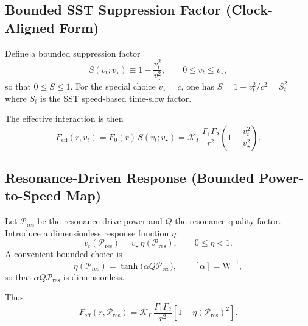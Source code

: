 \documentclass[11pt, a4paper]{article}
\begin{document}
        \subsection{Bounded SST Suppression Factor (Clock-Aligned Form)}
            Define a bounded suppression factor
            \begin{equation}
                S(v_t;v_\star) \equiv 1-\frac{v_t^2}{v_\star^2},
                \qquad 0\le v_t \le v_\star,
                \label{eq:Svt}
            \end{equation}
            so that $0\le S\le 1$.
            For the special choice $v_\star=c$, one has $S = 1-v_t^2/c^2 = S_t^2$ where $S_t$ is the SST speed-based time-slow factor.
            
            The effective interaction is then
            \begin{equation}
                F_{\mathrm{eff}}(r,v_t) = F_0(r)\,S(v_t;v_\star)
                = \mathcal{K}_{\Gamma}\,\frac{\Gamma_1\Gamma_2}{r^2}
                \left(1-\frac{v_t^2}{v_\star^2}\right).
                \label{eq:Feff_vt}
            \end{equation}
        
        \subsection{Resonance-Driven Response (Bounded Power-to-Speed Map)}
            Let $\mathcal{P}_{\mathrm{res}}$ be the resonance drive power and $Q$ the resonance quality factor.
            Introduce a dimensionless response function $\eta$:
            \begin{equation}
                v_t(\mathcal{P}_{\mathrm{res}})=v_\star\,\eta(\mathcal{P}_{\mathrm{res}}),
                \qquad 0\le \eta <1.
                \label{eq:vt_eta}
            \end{equation}
            A convenient bounded choice is
            \begin{equation}
                \eta(\mathcal{P}_{\mathrm{res}})=
                \tanh\!\bigl(\alpha Q \mathcal{P}_{\mathrm{res}}\bigr),
                \qquad [\alpha]=\mathrm{W^{-1}},
                \label{eq:eta_tanh}
            \end{equation}
            so that $\alpha Q \mathcal{P}_{\mathrm{res}}$ is dimensionless.
            
            Thus
            \begin{equation}
                F_{\mathrm{eff}}(r,\mathcal{P}_{\mathrm{res}})
                =
                \mathcal{K}_{\Gamma}\,\frac{\Gamma_1\Gamma_2}{r^2}
                \left[1-\eta(\mathcal{P}_{\mathrm{res}})^2\right].
                \label{eq:Feff_P}
            \end{equation}
        
\end{document}
